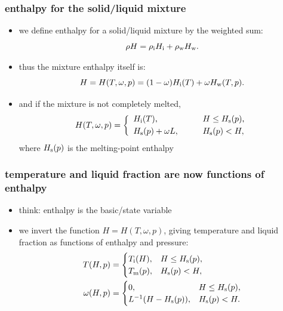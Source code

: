 \documentclass{beamer}
\begin{document}
\begin{frame}
  \frametitle{enthalpy for the solid/liquid mixture}

\begin{itemize}
\item we define enthalpy for a solid/liquid mixture by the weighted sum:
\begin{equation*}
  \rho H = \rho_{\text i} H_{\text i} + \rho_{\text w} H_{\text w}.
\end{equation*}
\item thus the mixture enthalpy itself is:
\begin{equation*}
   H = H(T,\omega,p) = (1-\omega) H_{\text i}(T) + \omega H_{\text w}(T,p).
\end{equation*}
\item and if the mixture is not completely melted,
\begin{equation*}
 H(T,\omega,p) = \left\{
  \begin{array}{ll} 
    H_{\text i}(T), & \qquad H \le H_{\text s}(p), \\[.25em]
    H_{\text s}(p) + \omega L, & \qquad H_{\text s}(p) < H,
  \end{array}
  \right.
\end{equation*}
where $H_{\text s}(p)$ is the melting-point enthalpy
\end{itemize}
\end{frame}


\begin{frame}
  \frametitle{temperature and liquid fraction are now functions of enthalpy}

\begin{itemize}
\item think: \alert{enthalpy is the basic/state variable}
\item we invert the function $H = H(T,\omega,p)$, giving temperature and liquid fraction as functions of enthalpy and pressure:
\begin{align*}
T(H,p) &= \begin{cases}
          T_{\text i}(H),     & H \le H_{\text s}(p), \\
          T_{\text m}(p),     & H_{\text s}(p) < H,
        \end{cases} \\
\omega(H,p) &= \begin{cases}
          0,                       & H \le H_{\text s}(p), \\
          L^{-1} ( H-H_\text{s}(p) ), & H_{\text s}(p) < H.
        \end{cases}
\end{align*}
\end{itemize}
\end{frame}
\end{document}
